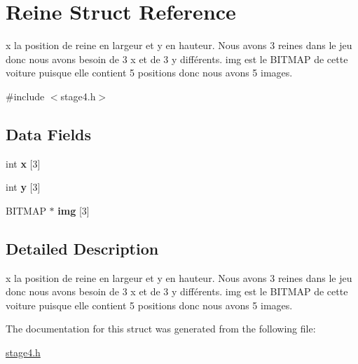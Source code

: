 \hypertarget{struct_reine}{\section{Reine Struct Reference}
\label{struct_reine}
}


x la position de reine en largeur et y en hauteur. Nous avons 3 reines dans le jeu donc nous avons besoin de 3 x et de 3 y différents. img est le B\-I\-T\-M\-A\-P de cette voiture puisque elle contient 5 positions donc nous avons 5 images.  




{\ttfamily \#include $<$stage4.\-h$>$}

\subsection*{Data Fields}
\begin{DoxyCompactItemize}
\item 
\hypertarget{struct_reine_a768191482a4f7f373f8449cb24a11c4b}{int {\bfseries x} \mbox{[}3\mbox{]}}\label{struct_reine_a768191482a4f7f373f8449cb24a11c4b}

\item 
\hypertarget{struct_reine_a33f58bd49edc8ddeef65843091bbfe16}{int {\bfseries y} \mbox{[}3\mbox{]}}\label{struct_reine_a33f58bd49edc8ddeef65843091bbfe16}

\item 
\hypertarget{struct_reine_a99933deee119efe612d38cf6759af35e}{B\-I\-T\-M\-A\-P $\ast$ {\bfseries img} \mbox{[}3\mbox{]}}\label{struct_reine_a99933deee119efe612d38cf6759af35e}

\end{DoxyCompactItemize}


\subsection{Detailed Description}
x la position de reine en largeur et y en hauteur. Nous avons 3 reines dans le jeu donc nous avons besoin de 3 x et de 3 y différents. img est le B\-I\-T\-M\-A\-P de cette voiture puisque elle contient 5 positions donc nous avons 5 images. 


\begin{DoxyItemize}
\item 
\end{DoxyItemize}

The documentation for this struct was generated from the following file\-:\begin{DoxyCompactItemize}
\item 
\hyperlink{stage4_8h}{stage4.\-h}\end{DoxyCompactItemize}
